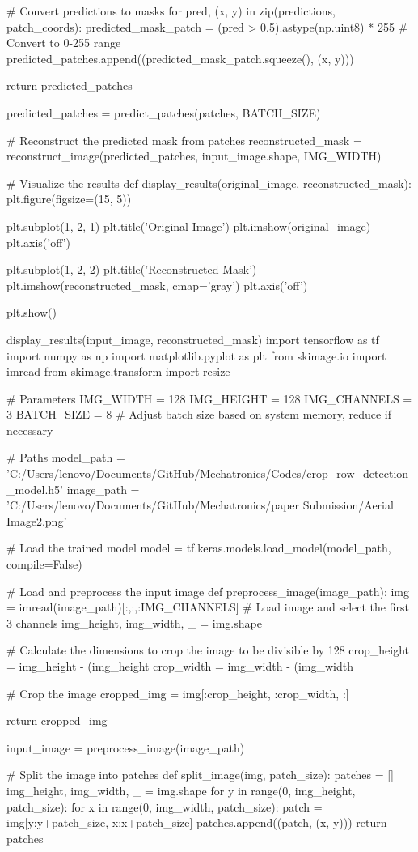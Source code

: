 \documentclass[conference]{IEEEtran}
\begin{document}
# Convert predictions to masks
for pred, (x, y) in zip(predictions, patch_coords):
predicted_mask_patch = (pred > 0.5).astype(np.uint8) * 255  # Convert to 0-255 range
predicted_patches.append((predicted_mask_patch.squeeze(), (x, y)))

return predicted_patches

predicted_patches = predict_patches(patches, BATCH_SIZE)

# Reconstruct the predicted mask from patches
reconstructed_mask = reconstruct_image(predicted_patches, input_image.shape, IMG_WIDTH)

# Visualize the results
def display_results(original_image, reconstructed_mask):
plt.figure(figsize=(15, 5))

plt.subplot(1, 2, 1)
plt.title('Original Image')
plt.imshow(original_image)
plt.axis('off')

plt.subplot(1, 2, 2)
plt.title('Reconstructed Mask')
plt.imshow(reconstructed_mask, cmap='gray')
plt.axis('off')

plt.show()

display_results(input_image, reconstructed_mask)
import tensorflow as tf
import numpy as np
import matplotlib.pyplot as plt
from skimage.io import imread
from skimage.transform import resize

# Parameters
IMG_WIDTH = 128
IMG_HEIGHT = 128
IMG_CHANNELS = 3
BATCH_SIZE = 8  # Adjust batch size based on system memory, reduce if necessary

# Paths
model_path = 'C:/Users/lenovo/Documents/GitHub/Mechatronics/Codes/crop_row_detection_model.h5'
image_path = 'C:/Users/lenovo/Documents/GitHub/Mechatronics/paper Submission/Aerial Image2.png'

# Load the trained model
model = tf.keras.models.load_model(model_path, compile=False)

# Load and preprocess the input image
def preprocess_image(image_path):
img = imread(image_path)[:,:,:IMG_CHANNELS]  # Load image and select the first 3 channels
img_height, img_width, _ = img.shape

# Calculate the dimensions to crop the image to be divisible by 128
crop_height = img_height - (img_height %
crop_width = img_width - (img_width %

# Crop the image
cropped_img = img[:crop_height, :crop_width, :]

return cropped_img

input_image = preprocess_image(image_path)

# Split the image into patches
def split_image(img, patch_size):
patches = []
img_height, img_width, _ = img.shape
for y in range(0, img_height, patch_size):
for x in range(0, img_width, patch_size):
patch = img[y:y+patch_size, x:x+patch_size]
patches.append((patch, (x, y)))
return patches
\end{document}
